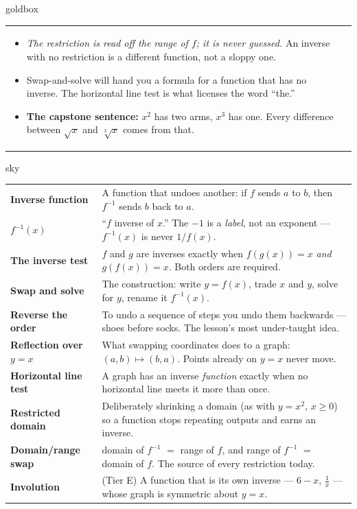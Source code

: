 \documentclass[10pt]{article}
\begin{document}
\begin{skillbox}{goldbox}
\begin{tabularx}{\linewidth}{@{}X|X@{}}
\begin{itemize}[leftmargin=1.1em, nosep, after=\vspace{2pt}]
  \item \emph{The restriction is read off the range of $f$; it is never guessed.} An inverse with no restriction is a different function, not a sloppy one.
  \item Swap-and-solve will hand you a formula for a function that has no inverse. The horizontal line test is what licenses the word ``the.''
  \item \textbf{The capstone sentence:} $x^{2}$ has two arms, $x^{3}$ has one. Every difference between $\sqrt{x}$ and $\sqrt[3]{x}$ comes from that.
\end{itemize}
\end{tabularx}
\end{skillbox}

\begin{skillbox}{sky}
\renewcommand{\arraystretch}{1.3}
\begin{tabularx}{\linewidth}{@{}l X@{}}
\textbf{Inverse function} & A function that undoes another: if $f$ sends $a$ to $b$, then $f^{-1}$ sends $b$ back to $a$. \\
\textbf{$f^{-1}(x)$} & ``$f$ inverse of $x$.'' The $-1$ is a \emph{label}, not an exponent --- $f^{-1}(x)$ is never $1/f(x)$. \\
\textbf{The inverse test} & $f$ and $g$ are inverses exactly when $f(g(x))=x$ \emph{and} $g(f(x))=x$. Both orders are required. \\
\textbf{Swap and solve} & The construction: write $y=f(x)$, trade $x$ and $y$, solve for $y$, rename it $f^{-1}(x)$. \\
\textbf{Reverse the order} & To undo a sequence of steps you undo them backwards --- shoes before socks. The lesson's most under-taught idea. \\
\textbf{Reflection over $y=x$} & What swapping coordinates does to a graph: $(a,b)\mapsto(b,a)$. Points already on $y=x$ never move. \\
\textbf{Horizontal line test} & A graph has an inverse \emph{function} exactly when no horizontal line meets it more than once. \\
\textbf{Restricted domain} & Deliberately shrinking a domain (as with $y=x^{2}$, $x\ge0$) so a function stops repeating outputs and earns an inverse. \\
\textbf{Domain/range swap} & domain of $f^{-1}$ $=$ range of $f$, and range of $f^{-1}$ $=$ domain of $f$. The source of every restriction today. \\
\textbf{Involution} & (Tier E) A function that is its own inverse --- $6-x$, $\frac1x$ --- whose graph is symmetric about $y=x$. \\
\end{tabularx}
\end{skillbox}
\end{document}
